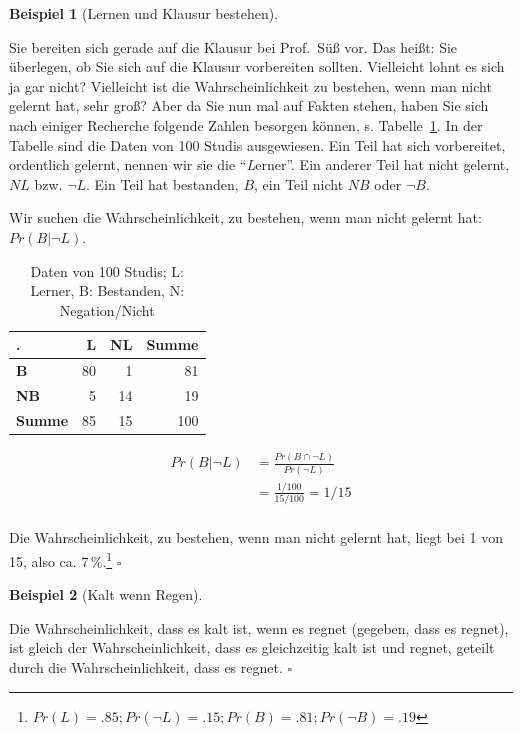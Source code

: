 \documentclass[
  ngerman,
  letterpaper,
  twoside,
  open=any]{scrbook}
\theoremstyle{definition}
\newtheorem{example}{Beispiel}[chapter]
\theoremstyle{plain}
\theoremstyle{definition}
\theoremstyle{definition}
\theoremstyle{definition}
\newtheorem{example}{Beispiel}[chapter]
\theoremstyle{definition}
\theoremstyle{remark}
\begin{document}
\begin{example}[Lernen und Klausur
bestehen]\protect\hypertarget{exm-klausur-bed-wskt2}{}\label{exm-klausur-bed-wskt2}

Sie bereiten sich gerade auf die Klausur bei Prof.~Süß vor. Das heißt:
Sie überlegen, ob Sie sich auf die Klausur vorbereiten sollten.
Vielleicht lohnt es sich ja gar nicht? Vielleicht ist die
Wahrscheinlichkeit zu bestehen, wenn man nicht gelernt hat, sehr groß?
Aber da Sie nun mal auf Fakten stehen, haben Sie sich nach einiger
Recherche folgende Zahlen besorgen können, s.
Tabelle~\ref{tbl-klausur-lernen}. In der Tabelle sind die Daten von 100
Studis ausgewiesen. Ein Teil hat sich vorbereitet, ordentlich gelernt,
nennen wir sie die \enquote{\emph{L}erner}. Ein anderer Teil hat nicht
gelernt, \(NL\) bzw. \(\neg L\). Ein Teil hat bestanden, \(B\), ein Teil
nicht \(NB\) oder \(\neg B\).

Wir suchen die Wahrscheinlichkeit, zu bestehen, wenn man nicht gelernt
hat: \(Pr(B |\neg L)\).

\begin{longtable}[t]{>{}lrrr}

\caption{\label{tbl-klausur-lernen}Daten von 100 Studis; L: Lerner, B:
Bestanden, N: Negation/Nicht}

\tabularnewline

\toprule
. & L & NL & Summe\\
\midrule
\textbf{B} & 80 & 1 & 81\\
\textbf{NB} & 5 & 14 & 19\\
\textbf{Summe} & 85 & 15 & 100\\
\bottomrule

\end{longtable}

\begin{align}
Pr(B |\neg L) &= \frac{Pr(B \cap \neg L)}{Pr(\neg L)} \\
&=\frac{1/100}{15/100} = 1/15 \\
\end{align}

Die Wahrscheinlichkeit, zu bestehen, wenn man nicht gelernt hat, liegt
bei 1 von 15, also ca. 7\,\%.\footnote{\(Pr(L) = .85; Pr(\neg L) = .15; Pr(B) =.81; Pr(\neg B) = .19\)}
\(\square\)

\end{example}

\begin{example}[Kalt wenn
Regen]\protect\hypertarget{exm-kalt-regen}{}\label{exm-kalt-regen}

Die Wahrscheinlichkeit, dass es kalt ist, wenn es regnet (gegeben, dass
es regnet), ist gleich der Wahrscheinlichkeit, dass es gleichzeitig kalt
ist und regnet, geteilt durch die Wahrscheinlichkeit, dass es regnet.
\(\square\)

\end{example}
\end{document}
